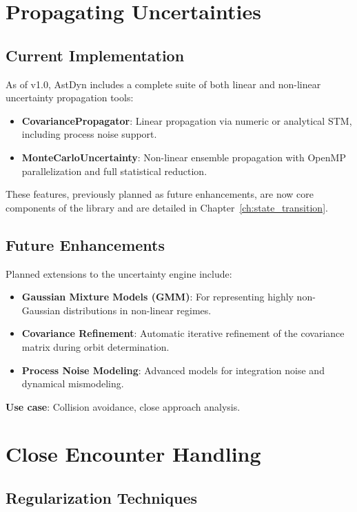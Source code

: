 \section{Propagating Uncertainties}

\subsection{Current Implementation}

As of v1.0, AstDyn includes a complete suite of both linear and non-linear uncertainty propagation tools:
\begin{itemize}
    \item \textbf{CovariancePropagator}: Linear propagation via numeric or analytical STM, including process noise support.
    \item \textbf{MonteCarloUncertainty}: Non-linear ensemble propagation with OpenMP parallelization and full statistical reduction.
\end{itemize}

These features, previously planned as future enhancements, are now core components of the library and are detailed in Chapter~\ref{ch:state_transition}.

\subsection{Future Enhancements}

Planned extensions to the uncertainty engine include:
\begin{itemize}
    \item \textbf{Gaussian Mixture Models (GMM)}: For representing highly non-Gaussian distributions in non-linear regimes.
    \item \textbf{Covariance Refinement}: Automatic iterative refinement of the covariance matrix during orbit determination.
    \item \textbf{Process Noise Modeling}: Advanced models for integration noise and dynamical mismodeling.
\end{itemize}

\textbf{Use case}: Collision avoidance, close approach analysis.

\section{Close Encounter Handling}

\subsection{Regularization Techniques}


